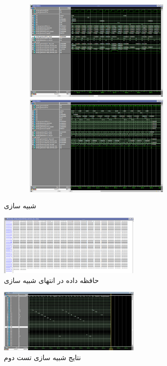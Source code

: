 \documentclass[11pt, a4paper]{article}
\begin{document}
	\begin{figure}[H]
		\begin{center}
			\includegraphics[width=10cm, height=5cm]{Photos/5.png}
			\includegraphics[width=10cm, height=5cm]{Photos/6.png}
		\end{center}
		\caption{شبیه سازی 
		}
		\label{Single_cycle_sim}
	\end{figure}
	
	\begin{figure}[H]
		\begin{center}
			\includegraphics[width=7cm]{Photos/9.png}
		\end{center}
		\caption{حافظه داده در انتهای شبیه سازی 
		}
		\label{Single_cycle_data_mem}
	\end{figure}
	
	\begin{figure}[H]
		\begin{center}
			\includegraphics[width=7cm]{Photos/10.jpg}
		\end{center}
		\caption{ نتایج شبیه سازی تست دوم}
		\label{mips2_single_cycle}
	\end{figure}
	
\end{document}
